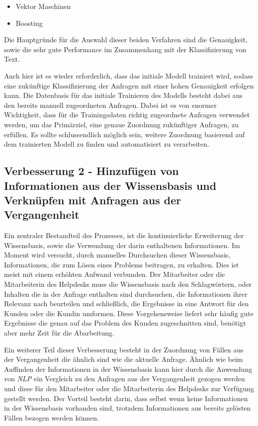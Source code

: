 \begin{itemize}
	\item Vektor Maschinen
	\item Boosting
\end{itemize}
Die Hauptgründe für die Auswahl dieser beiden Verfahren sind die Genauigkeit, sowie die sehr gute Performance im Zusammenhang mit der Klassifizierung von Text. 

Auch hier ist es wieder erforderlich, dass das initiale Modell trainiert wird, sodass eine zukünftige Klassifizierung der Anfragen mit einer hohen Genauigkeit erfolgen kann. Die Datenbasis für das initiale Trainieren des Modells besteht dabei aus den bereits manuell zugeordneten Anfragen. Dabei ist es von enormer Wichtigkeit, dass für die Trainingsdaten richtig zugeordnete Anfragen verwendet werden, um das Primärziel, eine genaue Zuordnung zukünftiger Anfragen, zu erfüllen. Es sollte schlussendlich möglich sein, weitere Zuordnung basierend auf dem trainierten Modell zu finden und automatisiert zu verarbeiten.

\subsection{Verbesserung 2 - Hinzufügen von Informationen aus der Wissensbasis und Verknüpfen mit Anfragen aus der Vergangenheit}
\label{sec:improvement2}
Ein zentraler Bestandteil des Prozesses, ist die kontinuierliche Erweiterung der Wissensbasis, sowie die Verwendung der darin enthaltenen Informationen. Im Moment wird versucht, durch manuelles Durchsuchen dieser Wissensbasis, Informationen, die zum Lösen eines Problems beitragen, zu erhalten. Dies ist meist mit einem erhöhten Aufwand verbunden. Der Mitarbeiter oder die Mitarbeiterin des Helpdesks muss die Wissensbasis nach den Schlagwörtern, oder Inhalten die in der Anfrage enthalten sind durchsuchen, die Informationen ihrer Relevanz nach beurteilen und schließlich, die Ergebnisse in eine Antwort für den Kunden oder die Kundin umformen. Diese Vorgehensweise liefert sehr häufig gute Ergebnisse die genau auf das Problem des Kunden zugeschnitten sind, benötigt aber mehr Zeit für die Abarbeitung. 

Ein weiterer Teil dieser Verbesserung besteht in der Zuordnung von Fällen aus der Vergangenheit die ähnlich sind wie die aktuelle Anfrage. Ähnlich wie beim Auffinden der Informationen in der Wissensbasis kann hier durch die Anwendung von \textit{NLP} ein Vergleich zu den Anfragen aus der Vergangenheit gezogen werden und diese für den Mitarbeiter oder die Mitarbeiterin des Helpdesks zur Verfügung gestellt werden. Der Vorteil besteht darin, dass selbst wenn keine Informationen in der Wissensbasis vorhanden sind, trotzdem Informationen aus bereits gelösten Fällen bezogen werden können.

